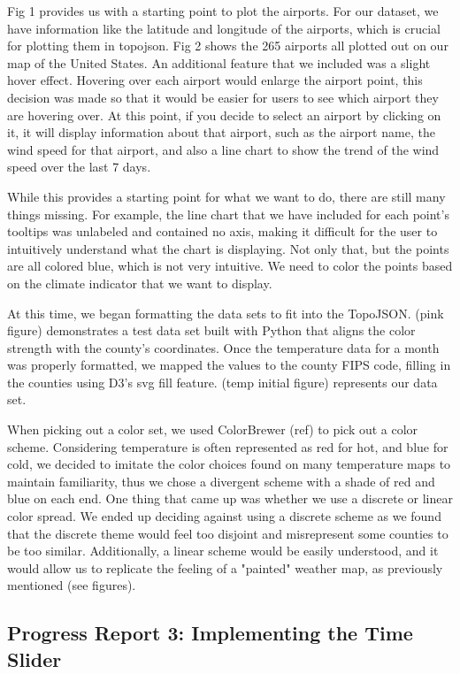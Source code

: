\documentclass[10pt,twocolumn,twoside]{opticajnl}
\begin{document}
Fig 1 provides us with a starting point to plot the airports. For our dataset, we have information like the latitude and longitude of the airports, which is crucial for plotting them in topojson. Fig 2 shows the 265 airports all plotted out on our map of the United States. An additional feature that we included was a slight hover effect. Hovering over each airport would enlarge the airport point, this decision was made so that it would be easier for users to see which airport they are hovering over. At this point, if you decide to select an airport by clicking on it, it will display information about that airport, such as the airport name, the wind speed for that airport, and also a line chart to show the trend of the wind speed over the last 7 days.

While this provides a starting point for what we want to do, there are still many things missing. For example, the line chart that we have included for each point's tooltips was unlabeled and contained no axis, making it difficult for the user to intuitively understand what the chart is displaying. Not only that, but the points are all colored blue, which is not very intuitive. We need to color the points based on the climate indicator that we want to display.

At this time, we began formatting the data sets to fit into the TopoJSON. (pink figure) demonstrates a test data set built with Python that aligns the color strength with the county's coordinates. Once the temperature data for a month was properly formatted, we mapped the values to the county FIPS code, filling in the counties using D3's svg fill feature. (temp initial figure) represents our data set. 

When picking out a color set, we used ColorBrewer (ref) to pick out a color scheme. Considering temperature is often represented as red for hot, and blue for cold, we decided to imitate the color choices found on many temperature maps to maintain familiarity, thus we chose a divergent scheme with a shade of red and blue on each end. One thing that came up was whether we use a discrete or linear color spread. We ended up deciding against using a discrete scheme as we found that the discrete theme would feel too disjoint and misrepresent some counties to be too similar. Additionally, a linear scheme would be easily understood, and it would allow us to replicate the feeling of a "painted" weather map, as previously mentioned (see figures).

\subsection {Progress Report 3: Implementing the Time Slider}
\end{document}
